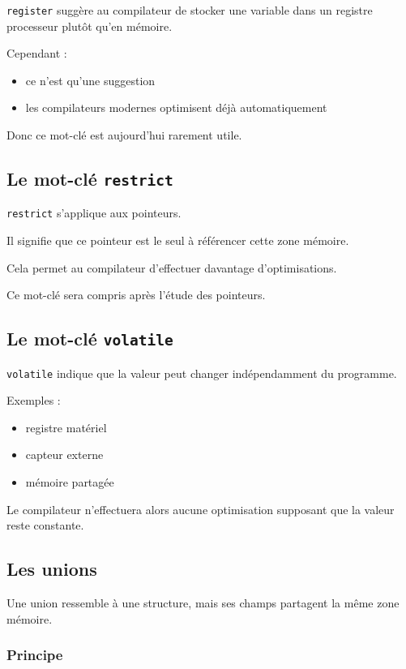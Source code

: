 \texttt{register} suggère au compilateur de stocker une variable
dans un registre processeur plutôt qu’en mémoire.

Cependant :

\begin{itemize}
    \item ce n’est qu’une suggestion
    \item les compilateurs modernes optimisent déjà automatiquement
\end{itemize}

Donc ce mot-clé est aujourd’hui rarement utile.

\subsection{Le mot-clé \texttt{restrict}}

\texttt{restrict} s’applique aux pointeurs.

Il signifie que ce pointeur est le seul à référencer cette zone mémoire.

Cela permet au compilateur d’effectuer davantage d’optimisations.

Ce mot-clé sera compris après l’étude des pointeurs.

\subsection{Le mot-clé \texttt{volatile}}

\texttt{volatile} indique que la valeur peut changer indépendamment du programme.

Exemples :

\begin{itemize}
    \item registre matériel
    \item capteur externe
    \item mémoire partagée
\end{itemize}

Le compilateur n’effectuera alors aucune optimisation
supposant que la valeur reste constante.

\subsection{Les unions}

Une union ressemble à une structure,
mais ses champs partagent la même zone mémoire.

\subsubsection{Principe}

